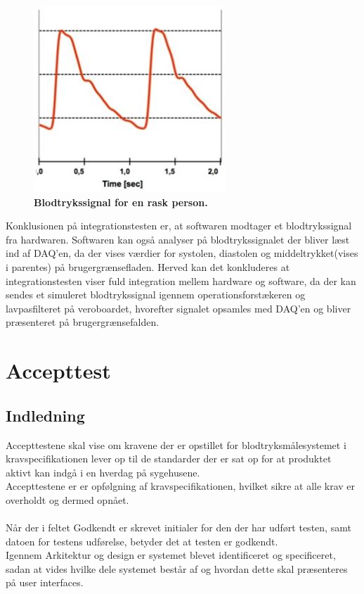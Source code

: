 \begin{figure}[htb]
\begin{minipage}{0.45\textwidth}
      \includegraphics[width=\textwidth]{billeder/blodtryk_graf}
      \caption{\textbf{Blodtrykssignal for en rask person.}}
    \label{fig:figur2}
  \end{minipage}
\end{figure}
Konklusionen på integrationstesten er, at softwaren modtager et blodtrykssignal fra hardwaren. Softwaren kan også analyser på blodtrykssignalet der bliver læst ind af DAQ’en, da der vises værdier for systolen, diastolen og middeltrykket(vises i parentes) på brugergrænsefladen. Herved kan det konkluderes at integrationstesten viser fuld integration mellem hardware og software, da der kan sendes et simuleret blodtrykssignal igennem operationsforstækeren og lavpasfilteret på veroboardet, hvorefter signalet opsamles med DAQ’en og bliver præsenteret på brugergrænsefalden.
\chapter{Accepttest}
\section{Indledning}
Accepttestene skal vise om kravene der er opstillet for blodtryksmålesystemet i kravspecifikationen lever op til de standarder der er sat op for at produktet aktivt kan indgå i en hverdag på sygehusene.\\
Accepttestene er er opfølgning af kravspecifikationen, hvilket sikre at alle krav er overholdt og dermed opnået.\\\\
Når der i feltet Godkendt er skrevet initialer for den der har udført testen, samt datoen for testens udførelse, betyder det at testen er godkendt.  \\
Igennem Arkitektur og design er systemet blevet identificeret og specificeret, sadan at vides hvilke dele systemet består af og hvordan dette skal præsenteres på user interfaces.
